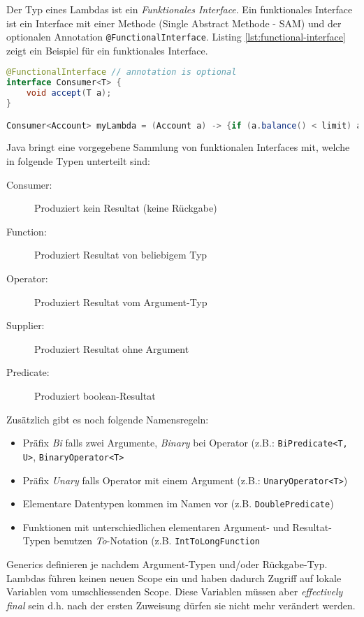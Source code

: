 Der Typ eines Lambdas ist ein \textit{Funktionales Interface}. Ein funktionales Interface ist ein Interface mit einer Methode (Single Abstract Methode - SAM) und der optionalen Annotation \verb|@FunctionalInterface|. Listing \ref{lst:functional-interface} zeigt ein Beispiel für ein funktionales Interface.

\begin{lstlisting}[language=Java, caption=functional interface (SAM), label=lst:functional-interface]
@FunctionalInterface // annotation is optional
interface Consumer<T> {
	void accept(T a);
}

Consumer<Account> myLambda = (Account a) -> {if (a.balance() < limit) a.alert(); };
\end{lstlisting}

Java bringt eine vorgegebene Sammlung von funktionalen Interfaces mit, welche in folgende Typen unterteilt sind:
\begin{description}
	\item[Consumer:] Produziert kein Resultat (keine Rückgabe)
	\item[Function:] Produziert Resultat von beliebigem Typ
	\item[Operator:] Produziert Resultat vom Argument-Typ
	\item[Supplier:] Produziert Resultat ohne Argument
	\item[Predicate:] Produziert boolean-Resultat
\end{description}
Zusätzlich gibt es noch folgende Namensregeln:
\begin{itemize}
	\item Präfix \textit{Bi} falls zwei Argumente, \textit{Binary} bei Operator (z.B.: \verb|BiPredicate<T, U>|, \verb|BinaryOperator<T>|
	\item Präfix \textit{Unary} falls Operator mit einem Argument (z.B.: \verb|UnaryOperator<T>|)
	\item Elementare Datentypen kommen im Namen vor (z.B. \verb|DoublePredicate|)
	\item Funktionen mit unterschiedlichen elementaren Argument- und Resultat-Typen benutzen \textit{To}-Notation (z.B. \verb|IntToLongFunction|
\end{itemize}
Generics definieren je nachdem Argument-Typen und/oder Rückgabe-Typ. Lambdas führen keinen neuen Scope ein und haben dadurch Zugriff auf lokale Variablen vom umschliessenden Scope. Diese Variablen müssen aber \textit{effectively final} sein d.h. nach der ersten Zuweisung dürfen sie nicht mehr verändert werden. 

